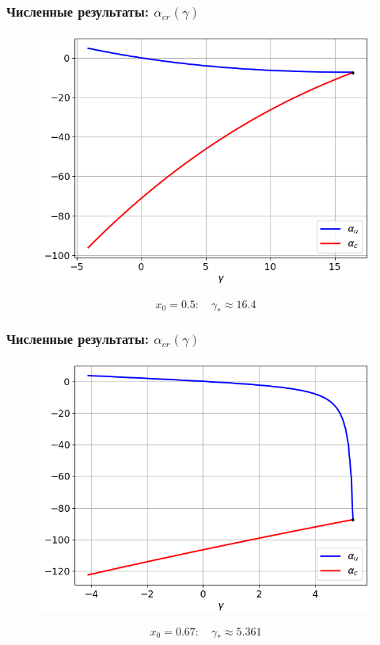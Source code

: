 \documentclass[fullscreen=true, unicode, bookmarks=false]{beamer}
\begin{document}
\begin{frame}
\frametitle{ Численные результаты: $ \alpha_{cr}(\gamma) $ }

\begin{figure} 
\includegraphics[scale=0.55]{alphas_12.png}  
\end{figure}

$$ x_0 = 0.5: \quad \gamma_* \approx 16.4 $$

\end{frame}

\begin{frame}
\frametitle{ Численные результаты: $ \alpha_{cr}(\gamma) $ }

\begin{figure} 
\includegraphics[scale=0.55]{alphas_23.png}  
\end{figure}

$$ x_0 = 0.67: \quad \gamma_* \approx 5.361 $$

\end{frame}
\end{document}
